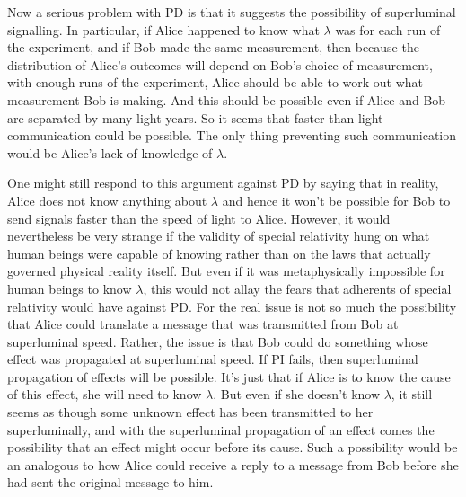 Now a serious problem with PD is that it suggests the possibility of superluminal signalling. In particular, if Alice happened to know what $\lambda$ was for each run of the experiment, and if Bob made the same measurement, then because the distribution of Alice's outcomes will depend on Bob's choice of measurement, with enough runs of the experiment, Alice should be able to work out what measurement Bob is making. And this should be possible even if Alice and Bob are separated by many light years. So it seems that faster than light communication could be possible. The only thing preventing such communication would be Alice's lack of knowledge of $\lambda$. 

One might still respond to this argument against PD by saying that in reality, Alice does not know anything about $\lambda$ and hence it won't be possible for Bob to send signals faster than the speed of light to Alice. However, it would nevertheless be very strange if the validity of special relativity hung on what human beings were capable of knowing rather than on the laws that actually governed physical reality itself. But even if it was metaphysically impossible for human beings to know $\lambda$, this would not allay the fears that adherents of special relativity would have against PD. For the real issue is not so much the possibility that Alice could translate a message that was transmitted from Bob at superluminal speed. Rather, the issue is that Bob could do something whose effect was propagated at superluminal speed. If PI fails, then superluminal propagation of effects will be possible.\label{lambdaknowledge} It's just that if Alice is to know the cause of this effect, she will need to know $\lambda$. But even if she doesn't know $\lambda$, it still seems as though some unknown effect has been transmitted to her superluminally, and with the superluminal propagation of an effect comes the possibility that an effect might occur before its cause. Such a possibility would be an analogous to how Alice could receive a reply to a message from Bob before she had sent the original message to him.